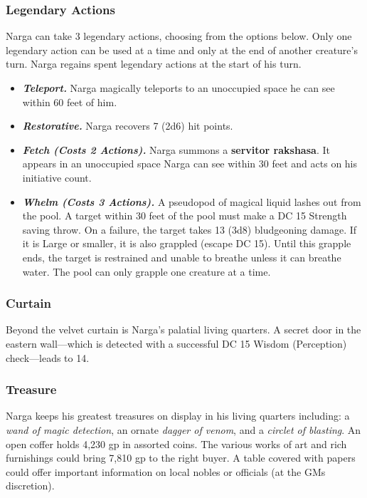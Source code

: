 \documentclass[10pt,a4paper,twoside,bg=print,twocolumn,openany,nodeprecatedcode]{dndbook}
\begin{document}
\subsubsection{Legendary Actions}
Narga can take 3 legendary actions, choosing from the options below. Only one legendary action can be used at a time and only at the end of another creature's turn. Narga regains spent legendary actions at the start of his turn.


\begin{itemize}
\item \textbf{\textit{Teleport.}} Narga magically teleports to an unoccupied space he can see within 60 feet of him.
\item \textbf{\textit{Restorative.}} Narga recovers 7 (2d6) hit points.
\item \textbf{\textit{Fetch (Costs 2 Actions).}} Narga summons a \textbf{servitor rakshasa}. It appears in an unoccupied space Narga can see within 30 feet and acts on his initiative count.
\item \textbf{\textit{Whelm (Costs 3 Actions).}} A pseudopod of magical liquid lashes out from the pool. A target within 30 feet of the pool must make a DC 15 Strength saving throw. On a failure, the target takes 13 (3d8) bludgeoning damage. If it is Large or smaller, it is also grappled (escape DC 15). Until this grapple ends, the target is restrained and unable to breathe unless it can breathe water. The pool can only grapple one creature at a time.
\end{itemize}

\subsubsection{Curtain}
Beyond the velvet curtain is Narga's palatial living quarters. A secret door in the eastern wall—which is detected with a successful DC 15 Wisdom (Perception) check—leads to 14.

\subsubsection{Treasure}
Narga keeps his greatest treasures on display in his living quarters including: a \textit{wand of magic detection}, an ornate \textit{dagger of venom}, and a \textit{circlet of blasting}. An open coffer holds 4,230 gp in assorted coins. The various works of art and rich furnishings could bring 7,810 gp to the right buyer. A table covered with papers could offer important information on local nobles or officials (at the GMs discretion).
\end{document}
